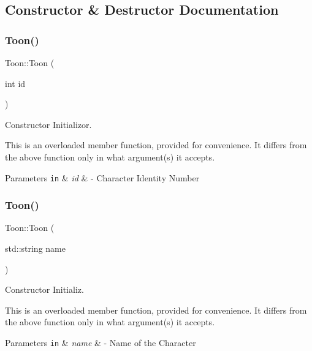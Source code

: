 \subsection{Constructor \& Destructor Documentation}
\mbox{\label{classToon_aed3a18077d6183f653916b241ffda895}} 
\subsubsection{\texorpdfstring{Toon()}{Toon()}\hspace{0.1cm}{\footnotesize\ttfamily [1/3]}}
{\footnotesize\ttfamily Toon\+::\+Toon (\begin{DoxyParamCaption}\item[{int}]{id }\end{DoxyParamCaption})}



Constructor Initializor. 

This is an overloaded member function, provided for convenience. It differs from the above function only in what argument(s) it accepts. 
\begin{DoxyParams}[1]{Parameters}
\mbox{\tt in}  & {\em id} & -\/ Character Identity Number \\
\hline
\end{DoxyParams}
\mbox{\label{classToon_aeab02877d7d267c2d6ca88dfa06b837f}} 
\subsubsection{\texorpdfstring{Toon()}{Toon()}\hspace{0.1cm}{\footnotesize\ttfamily [2/3]}}
{\footnotesize\ttfamily Toon\+::\+Toon (\begin{DoxyParamCaption}\item[{std\+::string}]{name }\end{DoxyParamCaption})}



Constructor Initializ. 

This is an overloaded member function, provided for convenience. It differs from the above function only in what argument(s) it accepts. 
\begin{DoxyParams}[1]{Parameters}
\mbox{\tt in}  & {\em name} & -\/ Name of the Character \\
\hline
\end{DoxyParams}
\mbox{\label{classToon_a665c51a1337f1ed9981d43d8700d4278}} 
